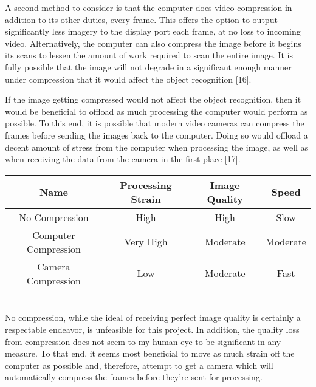 \documentclass[letterpaper,10pt,onecolumn,draftclsnofoot]{IEEEtran}
\begin{document}
A second method to consider is that the computer does video compression in addition to its other duties, every frame.  This offers the option to output significantly less imagery to the display port each frame, at no loss to incoming video.  Alternatively, the computer can also compress the image before it begins its scans to lessen the amount of work required to scan the entire image.  It is fully possible that the image will not degrade in a significant enough manner under compression that it would affect the object recognition [16].

If the image getting compressed would not affect the object recognition, then it would be beneficial to offload as much processing the computer would perform as possible.  To this end, it is possible that modern video cameras can compress the frames before sending the images back to the computer.  Doing so would offload a decent amount of stress from the computer when processing the image, as well as when receiving the data from the camera in the first place [17].

\begin{tabular}{|c|c|c|c|}
  \hline
  \textbf{Name} & \textbf{Processing Strain} & \textbf{Image Quality} & \textbf{Speed} \\
  \hline
  No Compression & High & High & Slow \\ 
  \hline
  Computer Compression & Very High & Moderate & Moderate  \\ 
  \hline
  Camera Compression & Low & Moderate & Fast \\ 
  \hline
\end{tabular} \\

No compression, while the ideal of receiving perfect image quality is certainly a respectable endeavor, is unfeasible for this project.  In addition, the quality loss from compression does not seem to my human eye to be significant in any measure.  To that end, it seems most beneficial to move as much strain off the computer as possible and, therefore, attempt to get a camera which will automatically compress the frames before they're sent for processing.
\end{document}
